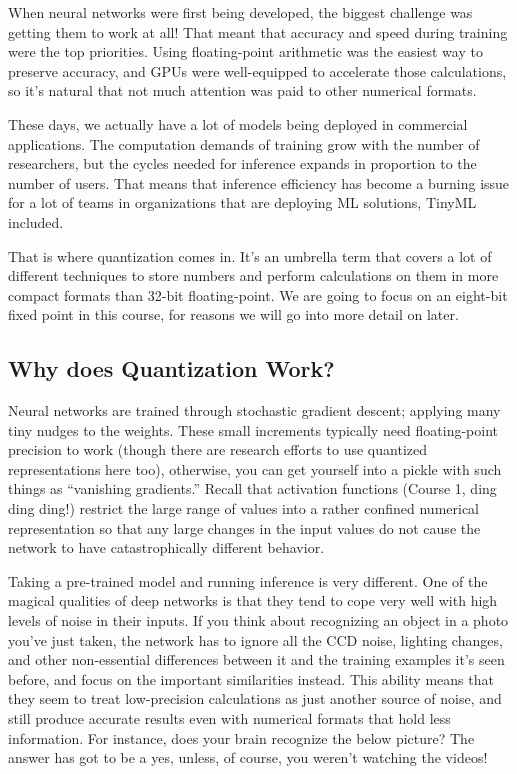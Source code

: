When neural networks were first being developed, the biggest challenge was getting them to work at all! That meant that accuracy and speed during training were the top priorities. Using floating-point arithmetic was the easiest way to preserve accuracy, and GPUs were well-equipped to accelerate those calculations, so it’s natural that not much attention was paid to other numerical formats.

These days, we actually have a lot of models being deployed in commercial applications. The computation demands of training grow with the number of researchers, but the cycles needed for inference expands in proportion to the number of users. That means that inference efficiency has become a burning issue for a lot of teams in organizations that are deploying ML solutions, TinyML included. 

That is where quantization comes in. It’s an umbrella term that covers a lot of different techniques to store numbers and perform calculations on them in more compact formats than 32-bit floating-point. We are going to focus on an eight-bit fixed point in this course, for reasons we will go into more detail on later.

\subsection{Why does Quantization Work?}

Neural networks are trained through stochastic gradient descent; applying many tiny nudges to the weights. These small increments typically need floating-point precision to work (though there are research efforts to use quantized representations here too), otherwise, you can get yourself into a pickle with such things as “vanishing gradients.” Recall that activation functions (Course 1, ding ding ding!) restrict the large range of values into a rather confined numerical representation so that any large changes in the input values do not cause the network to have catastrophically different behavior. 

Taking a pre-trained model and running inference is very different. One of the magical qualities of deep networks is that they tend to cope very well with high levels of noise in their inputs. If you think about recognizing an object in a photo you’ve just taken, the network has to ignore all the CCD noise, lighting changes, and other non-essential differences between it and the training examples it’s seen before, and focus on the important similarities instead. This ability means that they seem to treat low-precision calculations as just another source of noise, and still produce accurate results even with numerical formats that hold less information. For instance, does your brain recognize the below picture? The answer has got to be a yes, unless, of course, you weren’t watching the videos!

